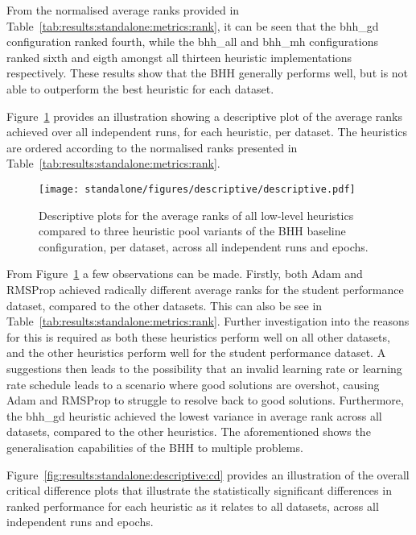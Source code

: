 From the normalised average ranks provided in Table~\ref{tab:results:standalone:metrics:rank}, it can be seen that the bhh\_gd configuration ranked fourth, while the bhh\_all and bhh\_mh configurations ranked sixth and eigth amongst all thirteen heuristic implementations respectively. These results show that the \acs{BHH} generally performs well, but is not able to outperform the best heuristic for each dataset.

Figure~\ref{fig:results:standalone:descriptive:descriptive} provides an illustration showing a descriptive plot of the average ranks achieved over all independent runs, for each heuristic, per dataset. The heuristics are ordered according to the normalised ranks presented in Table~\ref{tab:results:standalone:metrics:rank}.

\begin{figure}[htb]
	\centering
	\texttt{[image: standalone/figures/descriptive/descriptive.pdf]}
	\caption{Descriptive plots for the average ranks of all low-level heuristics compared to three heuristic pool variants of the \acs{BHH} baseline configuration, per dataset, across all independent runs and epochs.}
	\label{fig:results:standalone:descriptive:descriptive}
\end{figure}

From Figure~\ref{fig:results:standalone:descriptive:descriptive} a few observations can be made. Firstly, both \acs{Adam} and \acs{RMSProp} achieved radically different average ranks for the student performance dataset, compared to the other datasets. This can also be see in Table~\ref{tab:results:standalone:metrics:rank}. Further investigation into the reasons for this is required as both these heuristics perform well on all other datasets, and the other heuristics perform well for the student performance dataset. A suggestions then leads to the possibility that an invalid learning rate or learning rate schedule leads to a scenario where good solutions are overshot, causing \acs{Adam} and \acs{RMSProp} to struggle to resolve back to good solutions. Furthermore, the bhh\_gd heuristic achieved the lowest variance in average rank across all datasets, compared to the other heuristics. The aforementioned shows the generalisation capabilities of the \acs{BHH} to multiple problems.

Figure~\ref{fig:results:standalone:descriptive:cd} provides an illustration of the overall critical difference plots that illustrate the statistically significant differences in ranked performance for each heuristic as it relates to all datasets, across all independent runs and epochs.


